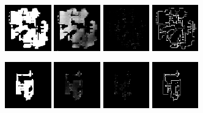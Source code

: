 \begin{figure}[h!] 
\begin{minipage}[b]{\linewidth}
		\begin{center}
		\includegraphics[width=2cm]{figures/results/samples/uncond/sample31_map_floormap_generated.png}
		\includegraphics[width=2cm]{figures/results/samples/uncond/sample31_map_heightmap_generated.png}
		\includegraphics[width=2cm]{figures/results/samples/uncond/sample31_map_thingsmap_generated.png}
		\includegraphics[width=2cm]{figures/results/samples/uncond/sample31_map_wallmap_generated.png}
	\end{center}
	
	\begin{center}
		\includegraphics[width=2cm]{figures/results/samples/uncond/sample3_map_floormap_generated.png}
		\includegraphics[width=2cm]{figures/results/samples/uncond/sample3_map_heightmap_generated.png}
		\includegraphics[width=2cm]{figures/results/samples/uncond/sample3_map_thingsmap_generated.png}
		\includegraphics[width=2cm]{figures/results/samples/uncond/sample3_map_wallmap_generated.png}
	\end{center}
	

\end{minipage}
\end{figure}
